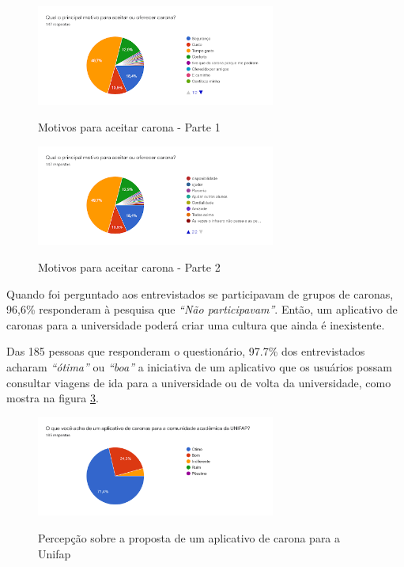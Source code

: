 \begin{figure}[!hbtp]
	\centering
	\caption{Motivos para aceitar carona - Parte 1}
	\includegraphics[width=0.7\textwidth]{./04-figuras/questionario/13.png}
	\label{fig:motivosparacarona1}
\end{figure}

\begin{figure}[!hbtp]
	\centering
	\caption{Motivos para aceitar carona - Parte 2}
	\includegraphics[width=0.7\textwidth]{./04-figuras/questionario/14.png}
	\label{fig:motivosparacarona2}
\end{figure}

Quando foi perguntado aos entrevistados se participavam de grupos de caronas, 96,6\% responderam à pesquisa que \textit{“Não participavam”}. Então, um aplicativo de caronas para a universidade poderá criar uma cultura que ainda é inexistente.

Das 185 pessoas que responderam o questionário, 97.7\% dos entrevistados acharam \textit{“ótima”} ou \textit{“boa”} a iniciativa de um aplicativo que os usuários possam consultar viagens de ida para a universidade ou de volta da universidade, como mostra na figura \ref{fig:percepcao}.
\begin{figure}[!hbtp]
	\centering
	\caption{Percepção sobre a proposta de um aplicativo de carona para a Unifap}
	\includegraphics[width=0.7\textwidth]{./04-figuras/questionario/15.png}
	\label{fig:percepcao}
\end{figure}

